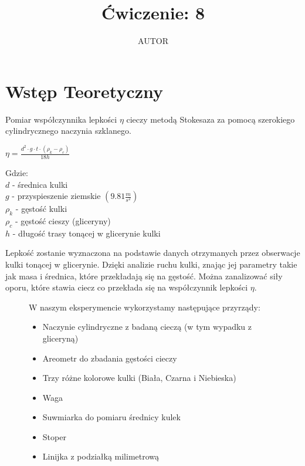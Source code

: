 \documentclass{article}
\title{Ćwiczenie: 8}
\author{AUTOR}
\date{}
\begin{document}
\maketitle
\section{Wstęp Teoretyczny}
\par Pomiar współczynnika lepkości $\eta$ cieczy metodą Stokesaza za pomocą 
szerokiego cylindrycznego 
naczynia szklanego. \\
\begin{center}
    $
    \eta=\frac{d^{2}\cdot g\cdot t\cdot (\rho_{k}-\rho_{c})}{18h}
    $
    \begin{flushleft}
        Gdzie:\\
        $d$ - średnica kulki\\
        $g$ - przyspieszenie ziemskie $(9.81\frac{m}{s^{2}})$\\
        $\rho_{k}$ - gęstość kulki\\
        $\rho_{c}$ - gęstość cieszy (gliceryny)\\
        $h$ - długość trasy tonącej w glicerynie kulki
    \end{flushleft}
\end{center}
\par Lepkość zostanie wyznaczona na podstawie danych otrzymanych przez obserwacje kulki 
tonącej w glicerynie. Dzięki analizie ruchu kulki, znając jej parametry takie 
jak masa i średnica, które przekładają się na gęstość. Można zanalizować siły oporu,
które stawia ciecz co przekłada się na współczynnik lepkości $\eta$.
\vspace{5ex}
\begin{figure}[h!]
    W naszym eksperymencie wykorzystamy następujące przyrządy:
    \begin{itemize}
        \item Naczynie cylindryczne z badaną cieczą (w tym wypadku z gliceryną)
        \item Areometr do zbadania gęstości cieczy
        \item Trzy różne kolorowe kulki (Biała, Czarna i Niebieska)
        \item Waga
        \item Suwmiarka do pomiaru średnicy kulek
        \item Stoper
        \item Linijka z podziałką milimetrową
    \end{itemize}


\end{figure}
\end{document}
